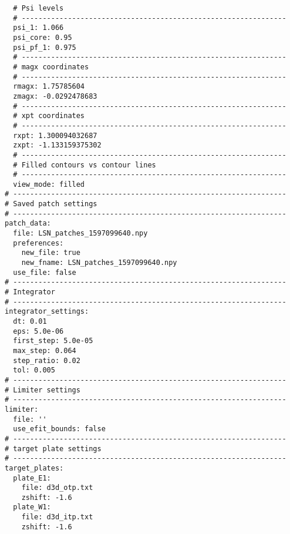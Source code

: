 \begin{lstlisting}
  # Psi levels
  # ---------------------------------------------------------------
  psi_1: 1.066
  psi_core: 0.95
  psi_pf_1: 0.975
  # ---------------------------------------------------------------
  # magx coordinates
  # ---------------------------------------------------------------
  rmagx: 1.75785604
  zmagx: -0.0292478683
  # ---------------------------------------------------------------
  # xpt coordinates
  # ---------------------------------------------------------------
  rxpt: 1.300094032687
  zxpt: -1.133159375302
  # ---------------------------------------------------------------
  # Filled contours vs contour lines
  # ---------------------------------------------------------------
  view_mode: filled
# -----------------------------------------------------------------
# Saved patch settings
# -----------------------------------------------------------------
patch_data:
  file: LSN_patches_1597099640.npy
  preferences:
    new_file: true
    new_fname: LSN_patches_1597099640.npy
  use_file: false
# -----------------------------------------------------------------
# Integrator
# -----------------------------------------------------------------
integrator_settings:
  dt: 0.01
  eps: 5.0e-06
  first_step: 5.0e-05
  max_step: 0.064
  step_ratio: 0.02
  tol: 0.005
# -----------------------------------------------------------------
# Limiter settings
# -----------------------------------------------------------------
limiter:
  file: ''
  use_efit_bounds: false
# -----------------------------------------------------------------
# target plate settings
# -----------------------------------------------------------------
target_plates:
  plate_E1:
    file: d3d_otp.txt
    zshift: -1.6
  plate_W1:
    file: d3d_itp.txt
    zshift: -1.6
\end{lstlisting}
